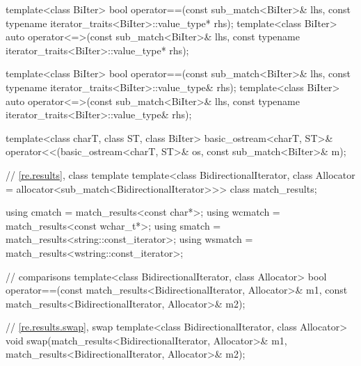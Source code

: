 \begin{codeblock}
{  template<class BiIter>
    bool operator==(const sub_match<BiIter>& lhs,
                    const typename iterator_traits<BiIter>::value_type* rhs);
  template<class BiIter>
    auto operator<=>(const sub_match<BiIter>& lhs,
                     const typename iterator_traits<BiIter>::value_type* rhs);

  template<class BiIter>
    bool operator==(const sub_match<BiIter>& lhs,
                    const typename iterator_traits<BiIter>::value_type& rhs);
  template<class BiIter>
    auto operator<=>(const sub_match<BiIter>& lhs,
                     const typename iterator_traits<BiIter>::value_type& rhs);

  template<class charT, class ST, class BiIter>
    basic_ostream<charT, ST>&
      operator<<(basic_ostream<charT, ST>& os, const sub_match<BiIter>& m);

  // \ref{re.results}, class template 
  template<class BidirectionalIterator,
           class Allocator = allocator<sub_match<BidirectionalIterator>>>
    class match_results;

  using cmatch  = match_results<const char*>;
  using wcmatch = match_results<const wchar_t*>;
  using smatch  = match_results<string::const_iterator>;
  using wsmatch = match_results<wstring::const_iterator>;

  //  comparisons
  template<class BidirectionalIterator, class Allocator>
    bool operator==(const match_results<BidirectionalIterator, Allocator>& m1,
                    const match_results<BidirectionalIterator, Allocator>& m2);

  // \ref{re.results.swap},  swap
  template<class BidirectionalIterator, class Allocator>
    void swap(match_results<BidirectionalIterator, Allocator>& m1,
              match_results<BidirectionalIterator, Allocator>& m2);

}
\end{codeblock}
